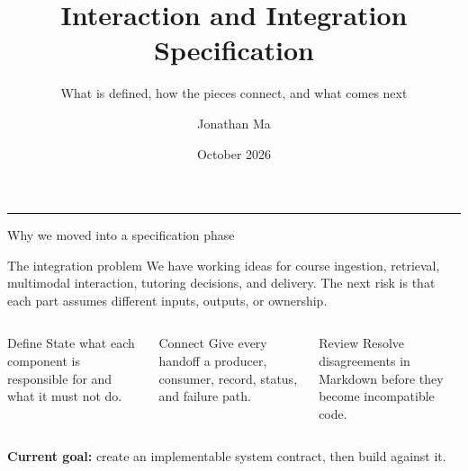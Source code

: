 \documentclass[aspectratio=169,10pt]{beamer}
\title{Interaction and Integration Specification}
\subtitle{What is defined, how the pieces connect, and what comes next}
\author{Jonathan Ma}
\institute{Digital Professor}
\date{October 2026}
\begin{document}
\begin{frame}[plain]
  \vfill
  {\color{HopkinsBlue}\LARGE\inserttitle\par}
  \vspace{.5em}
  {\color{Muted}\large\insertsubtitle\par}
  \vspace{1.4em}
  {\color{SpiritBlue}\rule{2.4cm}{2pt}}\par
  \vspace{1.2em}
  {\small\insertauthor\hfill\insertdate}
  \vfill
\end{frame}

\begin{frame}{Why we moved into a specification phase}
\begin{block}{The integration problem}
We have working ideas for course ingestion, retrieval, multimodal interaction, tutoring decisions, and delivery. The next risk is that each part assumes different inputs, outputs, or ownership.
\end{block}
\vspace{.55em}
\begin{columns}[T,onlytextwidth]
\begin{block}{Define}
State what each component is responsible for and what it must not do.
\end{block}
\begin{block}{Connect}
Give every handoff a producer, consumer, record, status, and failure path.
\end{block}
\begin{block}{Review}
Resolve disagreements in Markdown before they become incompatible code.
\end{block}
\end{columns}
\vspace{.55em}
\centering
\textbf{Current goal:} create an implementable system contract, then build against it.
\end{frame}
\end{document}
